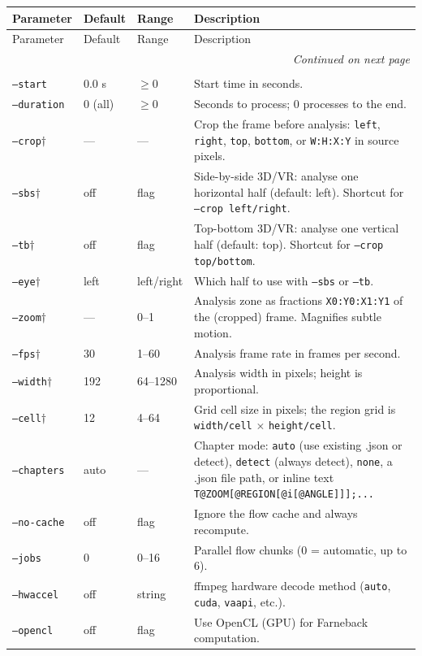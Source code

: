 \documentclass[11pt,a4paper]{article}
\newcommand{\code}[1]{\texttt{#1}}
\begin{document}
\begingroup
\small
\begin{longtable}{p{3.2cm} p{2.2cm} p{1.5cm} p{7.5cm}}
  \toprule
  Parameter & Default & Range & Description \\
  \midrule
  \endfirsthead
  \toprule
  Parameter & Default & Range & Description \\
  \midrule
  \endhead
  \midrule
  \multicolumn{4}{r}{\textit{Continued on next page}} \\
  \endfoot
  \bottomrule
  \endlastfoot

  \multicolumn{4}{l}{\textit{Input}} \\
  \code{--start}         & 0.0 s     & $\ge 0$    & Start time in seconds. \\
  \code{--duration}      & 0 (all)   & $\ge 0$    & Seconds to process; 0 processes to the end. \\
  \code{--crop}$\dagger$ & ---       & ---        & Crop the frame before analysis: \code{left}, \code{right}, \code{top}, \code{bottom}, or \code{W:H:X:Y} in source pixels. \\
  \code{--sbs}$\dagger$  & off       & flag       & Side-by-side 3D/VR: analyse one horizontal half (default: left). Shortcut for \code{--crop left/right}. \\
  \code{--tb}$\dagger$   & off       & flag       & Top-bottom 3D/VR: analyse one vertical half (default: top). Shortcut for \code{--crop top/bottom}. \\
  \code{--eye}$\dagger$  & left      & left/right & Which half to use with \code{--sbs} or \code{--tb}. \\
  \code{--zoom}$\dagger$ & ---       & 0--1       & Analysis zone as fractions \code{X0:Y0:X1:Y1} of the (cropped) frame. Magnifies subtle motion. \\
  \code{--fps}$\dagger$  & 30        & 1--60      & Analysis frame rate in frames per second. \\
  \code{--width}$\dagger$& 192       & 64--1280   & Analysis width in pixels; height is proportional. \\
  \code{--cell}$\dagger$ & 12        & 4--64      & Grid cell size in pixels; the region grid is \code{width/cell} $\times$ \code{height/cell}. \\
  \code{--chapters}      & auto      & ---        & Chapter mode: \code{auto} (use existing .json or detect), \code{detect} (always detect), \code{none}, a .json file path, or inline text \code{T@ZOOM[@REGION[@i[@ANGLE]]];...} \\
  \code{--no-cache}      & off       & flag       & Ignore the flow cache and always recompute. \\
  \code{--jobs}          & 0         & 0--16      & Parallel flow chunks (0 = automatic, up to 6). \\
  \code{--hwaccel}       & off       & string     & ffmpeg hardware decode method (\code{auto}, \code{cuda}, \code{vaapi}, etc.). \\
  \code{--opencl}        & off       & flag       & Use OpenCL (GPU) for Farneback computation. \\


\end{longtable}
\end{document}
